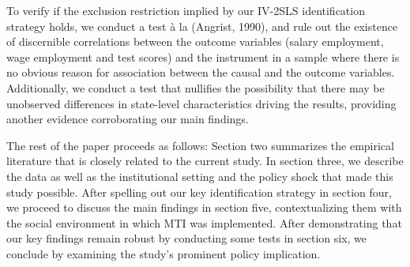 To verify if the exclusion restriction implied by our IV-2SLS identification strategy holds, we conduct a test à la (Angrist, 1990), and rule out the existence of discernible correlations between the outcome variables (salary employment, wage employment and test scores) and the instrument in a sample where there is no obvious reason for association between the causal and the outcome variables. Additionally, we conduct a test that nullifies the possibility that there may be unobserved differences in state-level characteristics driving the results, providing another evidence corroborating our main findings.  

The rest of the paper proceeds as follows: Section two summarizes the empirical literature that is closely related to the current study. In section three, we describe the data as well as the institutional setting and the policy shock that made this study possible. After spelling out our key identification strategy in section four, we proceed to discuss the main findings in section five, contextualizing them with the social environment in which MTI was implemented. After demonstrating that our key findings remain robust by conducting some tests in section six, we conclude by examining the study’s prominent policy implication.
